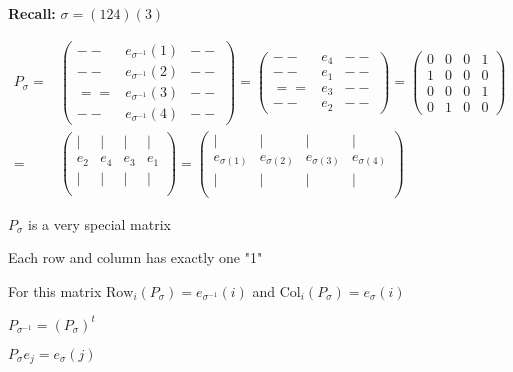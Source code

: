 \documentclass[12pt]{article}
\theoremstyle{plain}
\newcommand{\Col}{\mathrm{Col}}
\newcommand{\Row}{\mathrm{Row}}
\begin{document}
{\color{Brown}
	\textbf{Recall: }$\sigma = (1 2 4)(3)$

	\begin{align*}
		P_{\sigma} =& 
		\begin{pmatrix}
			-- & e_{\sigma^{-1}}(1) & --	\\
			-- & e_{\sigma^{-1}}(2) & --	\\
			== & e_{\sigma^{-1}}(3) & --	\\
			-- & e_{\sigma^{-1}}(4) & -- 
		\end{pmatrix}
		= 
		\begin{pmatrix}
			-- & e_4 & --	\\
			-- & e_1 & --	\\
			== & e_3 & --	\\
			-- & e_2 & --
		\end{pmatrix}
		= 
		\begin{pmatrix}
			0 & 0 & 0 & 1	\\
			1 & 0 & 0 & 0	\\
			0 & 0 & 0 & 1	\\
			0 & 1 & 0 & 0
		\end{pmatrix}\\
		= &
		\begin{pmatrix}
			| & | & | & |	\\
			e_2 & e_4 & e_3 & e_1	\\
			| & | & | & |	\\
		\end{pmatrix}
		= 
		\begin{pmatrix}
			| & | & | & |	\\
			e_{\sigma(1)} & e_{\sigma(2)} & e_{\sigma(3)} & e_{\sigma(4)}	\\
			| & | & | & |	\\
		\end{pmatrix}
	\end{align*}
}
\begin{description}
	\item $P_{\sigma}$ is a very special matrix
	\item Each row and column has exactly one "1"
	\item For this matrix $\Row_i(P_{\sigma}) = e_{\sigma^{-1}}(i)$
		and $\Col_i(P_{\sigma}) = e_{\sigma}(i)$
	\item $P_{\sigma^{-1}} = (P_{\sigma})^t$
	\item $P_{\sigma} e_j = e_{\sigma}(j)$
\end{description}
\end{document}
